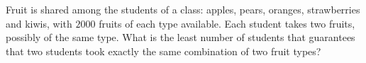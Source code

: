 Fruit is shared among the students of a class: apples, pears, oranges, strawberries and kiwis, with $2000$ fruits of each type available. Each student takes two fruits, possibly of the same type. What is the least number of students that guarantees that two students took exactly the same combination of two fruit types?
